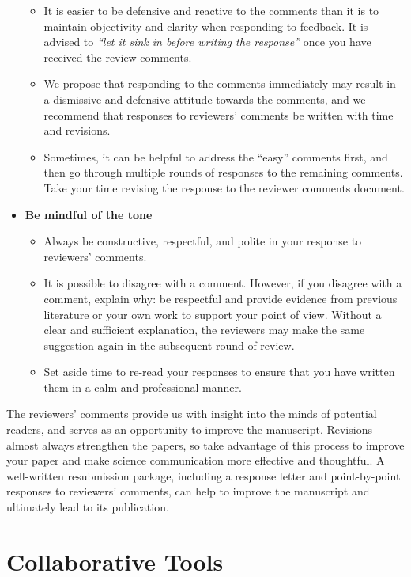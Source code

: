 \documentclass[
]{book}
\providecommand{\tightlist}{%
  \setlength{\itemsep}{0pt}\setlength{\parskip}{0pt}}
\begin{document}
\begin{itemize}
  \begin{itemize}
  \tightlist
  \item
    It is easier to be defensive and reactive to the comments than it is to maintain objectivity and clarity when responding to feedback. It is advised to \emph{``let it sink in before writing the response''} \citep{kotz2014effective10} once you have received the review comments.
  \item
    We propose that responding to the comments immediately may result in a dismissive and defensive attitude towards the comments, and we recommend that responses to reviewers' comments be written with time and revisions.
  \item
    Sometimes, it can be helpful to address the ``easy'' comments first, and then go through multiple rounds of responses to the remaining comments. Take your time revising the response to the reviewer comments document.
  \end{itemize}
\item
  \textbf{Be mindful of the tone}

  \begin{itemize}
  \tightlist
  \item
    Always be constructive, respectful, and polite in your response to reviewers' comments.
  \item
    It is possible to disagree with a comment. However, if you disagree with a comment, explain why: be respectful and provide evidence from previous literature or your own work to support your point of view. Without a clear and sufficient explanation, the reviewers may make the same suggestion again in the subsequent round of review.
  \item
    Set aside time to re-read your responses to ensure that you have written them in a calm and professional manner.
  \end{itemize}
\end{itemize}

The reviewers' comments provide us with insight into the minds of potential readers, and serves as an opportunity to improve the manuscript. Revisions almost always strengthen the papers, so take advantage of this process to improve your paper and make science communication more effective and thoughtful. A well-written resubmission package, including a response letter and point-by-point responses to reviewers' comments, can help to improve the manuscript and ultimately lead to its publication.

\hypertarget{collaborative-tools}{%
\chapter{Collaborative Tools}\label{collaborative-tools}}
\end{document}
